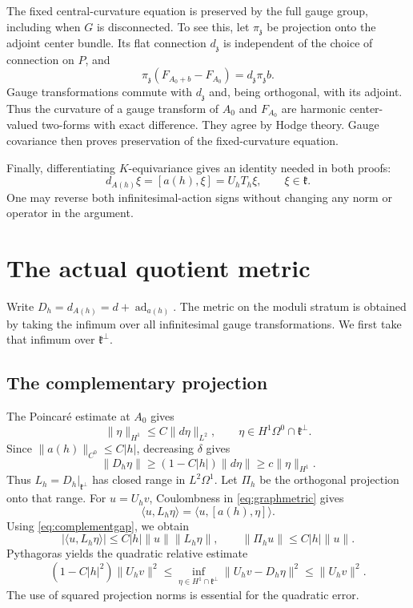\documentclass[11pt]{amsart}
\theoremstyle{definition}
\theoremstyle{remark}
\newcommand{\kk}{\mathfrak k}
\newcommand{\ad}{\operatorname{ad}}
\newcommand{\ip}[2]{\langle #1,#2\rangle}
\newcommand{\norm}[1]{\lVert #1\rVert}
\begin{document}
The fixed central-curvature equation is preserved by the full gauge
group, including when $G$ is disconnected. To see this, let
$\pi_{\mathfrak z}$ be projection onto the adjoint center bundle.
Its flat connection $d_{\mathfrak z}$ is independent of the choice
of connection on $P$, and
\[
 \pi_{\mathfrak z}(F_{A_0+b}-F_{A_0})
        =d_{\mathfrak z}\pi_{\mathfrak z}b.
\]
Gauge transformations commute with $d_{\mathfrak z}$ and, being
orthogonal, with its adjoint. Thus the curvature of a gauge transform
of $A_0$ and $F_{A_0}$ are harmonic center-valued two-forms with
exact difference. They agree by Hodge theory. Gauge covariance
then proves preservation of the fixed-curvature equation.

Finally, differentiating $K$-equivariance gives an identity needed
in both proofs:
\begin{equation}\label{eq:equivariance}
 d_{A(h)}\xi=[a(h),\xi]=U_hT_h\xi,
 \qquad\xi\in\kk.
\end{equation}
One may reverse both infinitesimal-action signs without changing
any norm or operator in the argument.

\section{The actual quotient metric}\label{sec:metric}

Write $D_h=d_{A(h)}=d+\ad_{a(h)}$. The metric on the moduli stratum
is obtained by taking the infimum over all infinitesimal gauge
transformations. We first take that infimum over $\kk^\perp$.

\subsection{The complementary projection}
The Poincaré estimate at $A_0$ gives
\[
 \norm\eta_{H^1}\leq C\norm{d\eta}_{L^2},
 \qquad \eta\in H^1\Omega^0\cap\kk^\perp.
\]
Since $\norm{a(h)}_{C^0}\leq C|h|$, decreasing $\delta$ gives
\begin{equation}\label{eq:complementgap}
 \norm{D_h\eta}\geq(1-C|h|)\norm{d\eta}
                  \geq c\norm\eta_{H^1}.
\end{equation}
Thus $L_h=D_h|_{\kk^\perp}$ has closed range in $L^2\Omega^1$.
Let $\Pi_h$ be the orthogonal projection onto that range. For
$u=U_hv$, Coulombness in \eqref{eq:graphmetric} gives
\[
 \ip{u}{L_h\eta}=\ip{u}{[a(h),\eta]}.
\]
Using \eqref{eq:complementgap}, we obtain
\begin{equation}\label{eq:angle}
 |\ip{u}{L_h\eta}|
 \leq C|h|\norm u\norm{L_h\eta},\qquad
 \norm{\Pi_hu}\leq C|h|\norm u.
\end{equation}
Pythagoras yields the quadratic relative estimate
\begin{equation}\label{eq:complementnorm}
 (1-C|h|^2)\norm{U_hv}^2
 \leq\inf_{\eta\in H^1\cap\kk^\perp}
       \norm{U_hv-D_h\eta}^2
 \leq\norm{U_hv}^2.
\end{equation}
The use of squared projection norms is essential for the quadratic
error.
\end{document}
